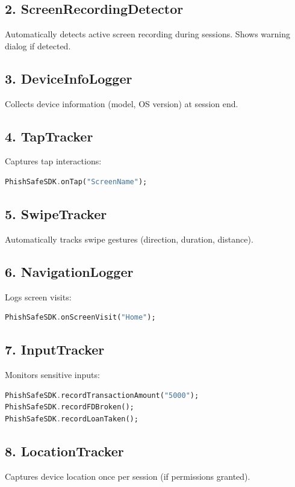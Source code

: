 \documentclass[11pt]{article}
\begin{document}
\subsection{2. ScreenRecordingDetector}
Automatically detects active screen recording during sessions. Shows warning dialog if detected.

\subsection{3. DeviceInfoLogger}
Collects device information (model, OS version) at session end.

\subsection{4. TapTracker}
Captures tap interactions:

\begin{lstlisting}[language=Dart]
PhishSafeSDK.onTap("ScreenName");
\end{lstlisting}

\subsection{5. SwipeTracker}
Automatically tracks swipe gestures (direction, duration, distance).

\subsection{6. NavigationLogger}
Logs screen visits:

\begin{lstlisting}[language=Dart]
PhishSafeSDK.onScreenVisit("Home");
\end{lstlisting}

\subsection{7. InputTracker}
Monitors sensitive inputs:

\begin{lstlisting}[language=Dart]
PhishSafeSDK.recordTransactionAmount("5000");
PhishSafeSDK.recordFDBroken();
PhishSafeSDK.recordLoanTaken();
\end{lstlisting}

\subsection{8. LocationTracker}
Captures device location once per session (if permissions granted).
\end{document}
